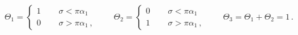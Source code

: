 \begin{equation}
\Theta_1=\left\{\begin{array}{lcr}1 & \,\,\,& \sigma <\pi\alpha_1 \\ 0 & \,\,\,& \sigma>\pi\alpha_1\,,\end{array}\right.
\qquad
\Theta_2=\left\{\begin{array}{lcr}0 &\,\,\, & \sigma <\pi\alpha_1 \\ 1 &\,\,\, & \sigma>\pi\alpha_1\,,\end{array}\right.
\qquad\Theta_3=\Theta_1+\Theta_2=1\,.
\end{equation}

